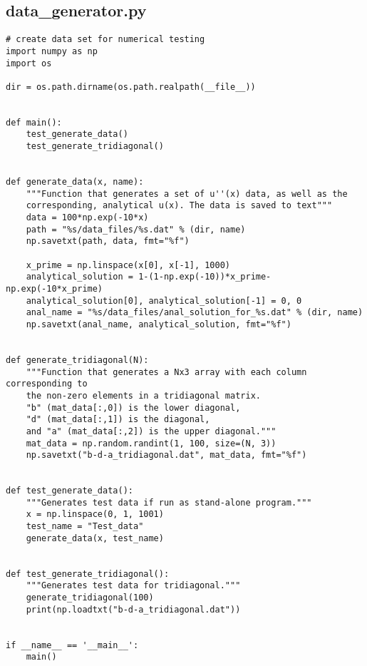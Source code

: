 \documentclass[english,notitlepage]{revtex4-1}  %
\begin{document}
\subsection{data\_generator.py}
\begin{lstlisting}
# create data set for numerical testing
import numpy as np
import os

dir = os.path.dirname(os.path.realpath(__file__))


def main():
    test_generate_data()
    test_generate_tridiagonal()


def generate_data(x, name):
    """Function that generates a set of u''(x) data, as well as the
    corresponding, analytical u(x). The data is saved to text"""
    data = 100*np.exp(-10*x)
    path = "%s/data_files/%s.dat" % (dir, name)
    np.savetxt(path, data, fmt="%f")

    x_prime = np.linspace(x[0], x[-1], 1000)
    analytical_solution = 1-(1-np.exp(-10))*x_prime-np.exp(-10*x_prime)
    analytical_solution[0], analytical_solution[-1] = 0, 0
    anal_name = "%s/data_files/anal_solution_for_%s.dat" % (dir, name)
    np.savetxt(anal_name, analytical_solution, fmt="%f")


def generate_tridiagonal(N):
    """Function that generates a Nx3 array with each column corresponding to
    the non-zero elements in a tridiagonal matrix.
    "b" (mat_data[:,0]) is the lower diagonal,
    "d" (mat_data[:,1]) is the diagonal,
    and "a" (mat_data[:,2]) is the upper diagonal."""
    mat_data = np.random.randint(1, 100, size=(N, 3))
    np.savetxt("b-d-a_tridiagonal.dat", mat_data, fmt="%f")


def test_generate_data():
    """Generates test data if run as stand-alone program."""
    x = np.linspace(0, 1, 1001)
    test_name = "Test_data"
    generate_data(x, test_name)


def test_generate_tridiagonal():
    """Generates test data for tridiagonal."""
    generate_tridiagonal(100)
    print(np.loadtxt("b-d-a_tridiagonal.dat"))


if __name__ == '__main__':
    main()

\end{lstlisting}

{}
\end{document}
